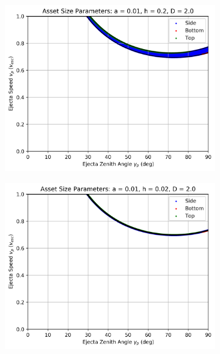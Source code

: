 \documentclass{article}
\begin{document}
\begin{figure}
	\begin{subfigure}[t]{.32\textwidth}
		\centering
		\includegraphics[width=.98\linewidth]{asset_speed_zenith_plot_1.100e+00_1.000e-02_2.000e-01_2.000e+00.png}  
		\label{fig:sub-asset_speed_zenith_h2_10}
	\end{subfigure}
	\begin{subfigure}[t]{.32\textwidth}
		\centering
		\includegraphics[width=.98\linewidth]{asset_speed_zenith_plot_1.100e+00_1.000e-02_2.000e-02_2.000e+00.png}  
		\label{fig:sub-asset_speed_zenith_h2_11}
	\end{subfigure}

\end{figure}
\end{document}
